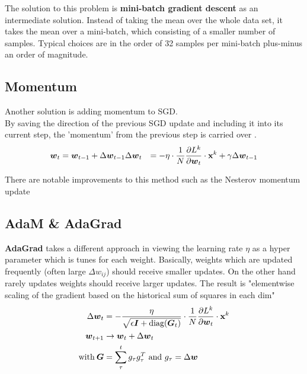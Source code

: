 The solution to this problem is \textbf{mini-batch gradient descent} as an intermediate solution.
Instead of taking the mean over the whole data set, it takes the mean over a mini-batch, which consisting of a smaller number of samples.
Typical choices are in the order of 32 samples per mini-batch plus-minus an order of magnitude.

\subsection{Momentum}
Another solution is adding momentum to SGD.\\
By saving the direction of the previous SGD update and including it into its current step, the 'momentum' from the previous step is carried over \cite{ommer}.
\begin{align}
    \boldsymbol{w}_t & = \boldsymbol{w}_{t-1} + \Delta \boldsymbol{w}_{t-1}
    \Delta \boldsymbol{w}_t & = - \eta \cdot \frac{1}{N} \frac{\partial L^k}{\partial \boldsymbol{w}_t} \cdot \mathbf{x}^k + \gamma \Delta \boldsymbol{w}_{t-1}
\end{align}

There are notable improvements to this method such as the Nesterov momentum update \cite{ommer}

\subsection{AdaM \& AdaGrad}
\textbf{AdaGrad} takes a different approach in viewing the learning rate $\eta$ as a hyper parameter which is tunes for each weight.
Basically, weights which are updated frequently (often large $\Delta w_{ij}$) should receive smaller updates.
On the other hand rarely updates weights should receive larger updates.
The result is "elementwise scaling of the gradient based on the historical sum of squares in each dim" \cite{ommer}
\begin{align}
    \Delta \boldsymbol{w}_t & = - \frac{\eta}{\sqrt{\epsilon \boldsymbol{I} + \text{diag}(\boldsymbol{G}_t)}} \cdot \frac{1}{N} \frac{\partial L^k}{\partial \boldsymbol{w}_t} \cdot \mathbf{x}^k \\
    \boldsymbol{w}_{t+1} & \rightarrow \boldsymbol{w}_t + \Delta \boldsymbol{w}_t \\
    \text{with} \: \boldsymbol{G} & = \sum_{\tau}^{t} g_\tau g_\tau^T \text{ and } g_\tau = \Delta \boldsymbol{w}
\end{align}

